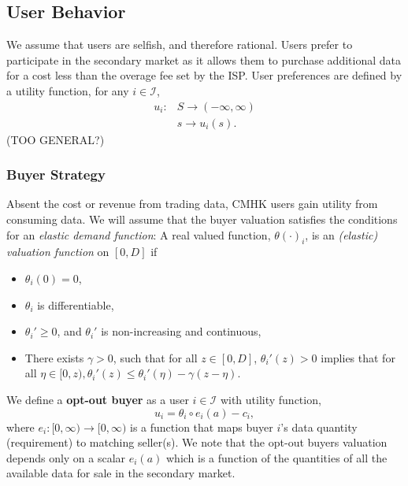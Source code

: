 \documentclass[12pt]{article}
\theoremstyle{definition}
\newcommand{\mcI}{\mathcal{I}}
\begin{document}
\begin{multicols}{2}
\subsection{User Behavior}

We assume that users are selfish, and therefore
rational. Users prefer to participate in the secondary market as it allows them to purchase
additional data for a cost less than the overage fee set by the ISP. 
User preferences are defined by a utility function, for any $i\in\mcI$,
\begin{align*}
    u_i : &S \rightarrow (-\infty, \infty) \\
          &s \rightarrow u_i(s).
\end{align*}
(TOO GENERAL?)

\subsubsection{Buyer Strategy}

Absent the cost or revenue from trading data, CMHK users gain utility from consuming
data. 
We will assume that the buyer valuation satisfies the conditions for an
\emph{elastic demand function}: 
A real valued function, $\theta(\cdot)_i$, is an \emph{(elastic) valuation
function} on $[0, D]$ if 
\begin{itemize}
    \item $\theta_i(0) = 0$,
    \item $\theta_i$ is differentiable,
    \item ${\theta_i}' \ge 0$, and ${\theta_i}'$ is non-increasing and continuous,
     \item There exists $\gamma > 0$, such that for all $z \in [0,D]$,
${\theta_i}'(z) > 0$ implies that for all $\eta \in [0, z), {\theta_i}'(z) \le
{\theta_i}'(\eta)
- \gamma(z - \eta)$. 
\end{itemize}

We define a \textbf{opt-out buyer} as a user $i\in\mcI$ with utility
function,
\begin{equation}\label{buyerutility}
    u_i = \theta_i \circ e_i(a) - c_i,
\end{equation}
where $e_i : [0, \infty) \rightarrow [0,\infty)$ is %
a function that maps buyer $i$'s data quantity (requirement) to matching
seller(s). We note that the opt-out buyers valuation depends only on a scalar $e_i(a)$ which is a function of the
quantities of all the available data for sale in the secondary market. 


\end{multicols}
\end{document}
